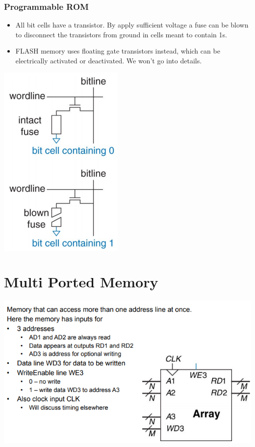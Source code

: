 \documentclass{article}[18pt]
\begin{document}
\subsubsection{Programmable ROM}
\begin{itemize}
	\item All bit cells have a transistor.
	By apply sufficient voltage a fuse can be blown
	to disconnect the transistors from ground in
	cells meant to contain 1s. 
	\item FLASH memory uses floating gate transistors
	instead, which can be electrically activated or
	deactivated. We won’t go into details.
\end{itemize}
\begin{center}
	\includegraphics[scale=0.7]{PROM}
\end{center}
\section{Multi Ported Memory}
\begin{center}
	\includegraphics[scale=0.7]{multi-port}
\end{center}
\end{document}
